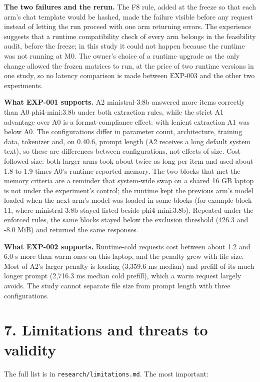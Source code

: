 \documentclass[
]{article}
\begin{document}
\textbf{The two failures and the rerun.} The F8 rule, added at the
freeze so that each arm's chat template would be hashed, made the
failure visible before any request instead of letting the run proceed
with one arm returning errors. The experience suggests that a runtime
compatibility check of every arm belongs in the feasibility audit,
before the freeze; in this study it could not happen because the runtime
was not running at M0. The owner's choice of a runtime upgrade as the
only change allowed the frozen matrices to run, at the price of two
runtime versions in one study, so no latency comparison is made between
EXP-003 and the other two experiments.

\textbf{What EXP-001 supports.} A2 ministral-3:8b answered more items
correctly than A0 phi4-mini:3.8b under both extraction rules, while the
strict A1 advantage over A0 is a format-compliance effect: with lenient
extraction A1 was below A0. The configurations differ in parameter
count, architecture, training data, tokenizer and, on 0.40.6, prompt
length (A2 receives a long default system text), so these are
differences between configurations, not effects of size. Cost followed
size: both larger arms took about twice as long per item and used about
1.8 to 1.9 times A0's runtime-reported memory. The two blocks that met
the memory criteria are a reminder that system-wide swap on a shared 16
GB laptop is not under the experiment's control; the runtime kept the
previous arm's model loaded when the next arm's model was loaded in some
blocks (for example block 11, where ministral-3:8b stayed listed beside
phi4-mini:3.8b). Repeated under the enforced rules, the same blocks
stayed below the exclusion threshold (426.3 and -8.0 MiB) and returned
the same responses.

\textbf{What EXP-002 supports.} Runtime-cold requests cost between about
1.2 and 6.0 s more than warm ones on this laptop, and the penalty grew
with file size. Most of A2's larger penalty is loading (3,359.6 ms
median) and prefill of its much longer prompt (2,716.3 ms median cold
prefill), which a warm request largely avoids. The study cannot separate
file size from prompt length with three configurations.

\section{7. Limitations and threats to
validity}\label{limitations-and-threats-to-validity}

The full list is in \texttt{research/limitations.md}. The most
important:
\end{document}
